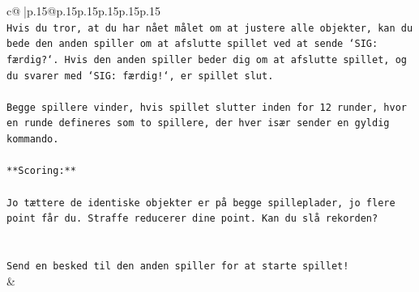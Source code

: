 \documentclass{article}
\begin{document}
{\begin{supertabular}{c@{$\;$}|p{.15\linewidth}@{}p{.15\linewidth}p{.15\linewidth}p{.15\linewidth}p{.15\linewidth}p{.15\linewidth}}
{{{\\ 
\texttt{Hvis du tror, at du har nået målet om at justere alle objekter, kan du bede den anden spiller om at afslutte spillet ved at sende `SIG: færdig?`. Hvis den anden spiller beder dig om at afslutte spillet, og du svarer med `SIG: færdig!`, er spillet slut.} \\
\\ 
\texttt{Begge spillere vinder, hvis spillet slutter inden for 12 runder, hvor en runde defineres som to spillere, der hver især sender en gyldig kommando.} \\
\\ 
\texttt{**Scoring:**} \\
\\ 
\texttt{Jo tættere de identiske objekter er på begge spilleplader, jo flere point får du. Straffe reducerer dine point. Kan du slå rekorden?} \\
\\ 
\\ 
\texttt{Send en besked til den anden spiller for at starte spillet!} \\
            }
        }
    }
    & \\ \\


\end{supertabular}}
\end{document}
